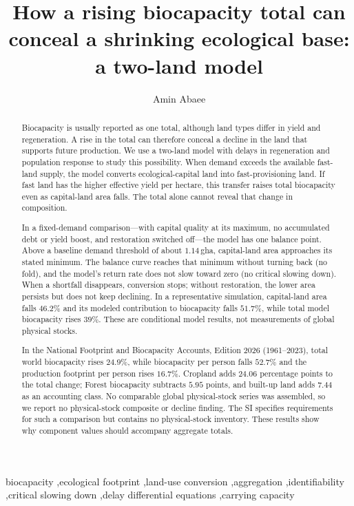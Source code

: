 \documentclass[preprint,12pt,authoryear]{elsarticle}
\begin{document}
\begin{frontmatter}

\title{How a rising biocapacity total can conceal a shrinking ecological base: a two-land model}

\author[1]{Amin Abaee}

\begin{abstract}
\footnotesize
Biocapacity is usually reported as one total, although land types differ in yield and regeneration. A rise in the total can therefore conceal a decline in the land that supports future production. We use a two-land model with delays in regeneration and population response to study this possibility. When demand exceeds the available fast-land supply, the model converts ecological-capital land into fast-provisioning land. If fast land has the higher effective yield per hectare, this transfer raises total biocapacity even as capital-land area falls. The total alone cannot reveal that change in composition.

In a fixed-demand comparison—with capital quality at its maximum, no accumulated debt or yield boost, and restoration switched off—the model has one balance point. Above a baseline demand threshold of about $1.14$\,gha, capital-land area approaches its stated minimum. The balance curve reaches that minimum without turning back (no fold), and the model's return rate does not slow toward zero (no critical slowing down). When a shortfall disappears, conversion stops; without restoration, the lower area persists but does not keep declining. In a representative simulation, capital-land area falls $46.2\%$ and its modeled contribution to biocapacity falls $51.7\%$, while total model biocapacity rises $39\%$. These are conditional model results, not measurements of global physical stocks.

In the National Footprint and Biocapacity Accounts, Edition 2026 (1961--2023), total world biocapacity rises $24.9\%$, while biocapacity per person falls $52.7\%$ and the production footprint per person rises $16.7\%$. Cropland adds $24.06$ percentage points to the total change; Forest biocapacity subtracts $5.95$ points, and built-up land adds $7.44$ as an accounting class. No comparable global physical-stock series was assembled, so we report no physical-stock composite or decline finding. The SI specifies requirements for such a comparison but contains no physical-stock inventory. These results show why component values should accompany aggregate totals.
\end{abstract}

\begin{keyword}
\footnotesize
biocapacity \sep ecological footprint \sep land-use conversion \sep aggregation \sep identifiability \sep critical slowing down \sep delay differential equations \sep carrying capacity
\end{keyword}

\end{frontmatter}
\end{document}
